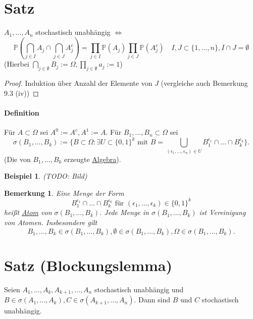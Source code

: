 \documentclass[a4paper,11pt,notitlepage]{report}
\newtheorem{remark}{Bemerkung}[chapter]
\newtheorem{example}{Beispiel}[chapter]
\newcommand{\Prim}{{\ensuremath{\mathbb{P}}}}
\begin{document}
\section{Satz}
$A_1, \ldots, A_n$ stochastisch unabhängig $\Leftrightarrow$
$$\Prim(\bigcap\limits_{j \in I}{A_j} \cap \bigcap\limits_{j \in J}{A_j^c}) = \prod\limits_{j \in I}{\Prim(A_j)} \prod\limits_{j \in J}{\Prim(A_j^c)} \quad I,J \subset \{1, \ldots, n\}, I \cap J = \emptyset$$
(Hierbei $\bigcap\limits_{j \in \emptyset}{B_j}:= \Omega, \prod\limits_{j \in \emptyset}{a_j}:=1$)

\begin{proof}
	Induktion über Anzahl der Elemente von $J$ (vergleiche auch Bemerkung 9.3 (iv))
\end{proof}

\paragraph{Definition}
Für $A \subset \Omega$ sei $A^0 := A^c, A^1 := A$.
\newline
Für $B_1, \ldots, B_n \subset \Omega$ sei
$$\sigma(B_1, \ldots, B_k):=\{B \subset \Omega \colon \exists U \subset \{0,1\}^k \text{ mit } B = \bigcup\limits_{(\epsilon_1, \ldots, \epsilon_n) \in U}{B_1^{\epsilon_1} \cap \ldots \cap B_k^{\epsilon_k}}\}.$$
(Die von $B_1, \ldots, B_k$ erzeugte \underline{Algebra}).

\begin{example}
	(TODO: Bild)
\end{example}

\begin{remark}
	Eine Menge der Form
	$$B_1^{\epsilon_1} \cap \ldots \cap B_k^{\epsilon_k} \text{ für } (\epsilon_1, \ldots, \epsilon_k) \in \{0,1\}^k$$
	heißt \underline{Atom} von $\sigma(B_1, \ldots, B_k)$. Jede Menge in $\sigma(B_1, \ldots, B_k)$ ist Vereinigung von Atomen. Insbesondere gilt
	$$B_1, \ldots, B_k \in \sigma(B_1, \ldots, B_k), \emptyset \in \sigma(B_1, \ldots, B_k), \Omega \in \sigma(B_1, \ldots, B_k).$$
\end{remark}

\section{Satz (Blockungslemma)}
Seien $A_1, \ldots, A_k, A_{k+1}, \ldots, A_n$ stochastisch unabhängig und \newline $B \in \sigma(A_1, \ldots, A_k), C \in \sigma(A_{k+1}, \ldots, A_n)$. Dann sind $B$ und $C$ stochastisch unabhängig.
\end{document}

